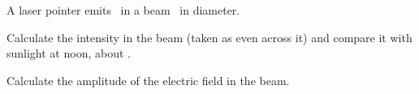 A laser pointer emits \PlO\ in a beam \dbO\ in diameter.

\begin{abcliste}
\abc Calculate the intensity in the beam (taken as even across it) and compare it with sunlight at noon, about \IsO.

\abc Calculate the amplitude of the electric field in the beam.
\end{abcliste}
